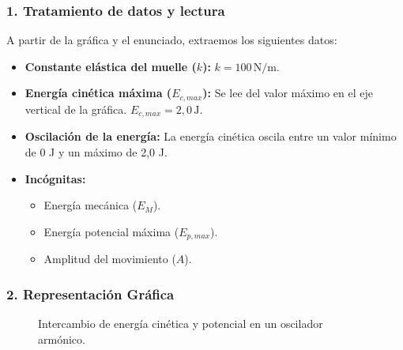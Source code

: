 \subsubsection*{1. Tratamiento de datos y lectura}
A partir de la gráfica y el enunciado, extraemos los siguientes datos:
\begin{itemize}
    \item \textbf{Constante elástica del muelle ($k$):} $k=100 \, \text{N/m}$.
    \item \textbf{Energía cinética máxima ($E_{c,max}$):} Se lee del valor máximo en el eje vertical de la gráfica. $E_{c,max} = 2,0 \, \text{J}$.
    \item \textbf{Oscilación de la energía:} La energía cinética oscila entre un valor mínimo de 0 J y un máximo de 2,0 J.
    \item \textbf{Incógnitas:}
    \begin{itemize}
        \item Energía mecánica ($E_M$).
        \item Energía potencial máxima ($E_{p,max}$).
        \item Amplitud del movimiento ($A$).
    \end{itemize}
\end{itemize}

\subsubsection*{2. Representación Gráfica}
\begin{figure}[H]
    \centering
    \caption{Intercambio de energía cinética y potencial en un oscilador armónico.}
\end{figure}

